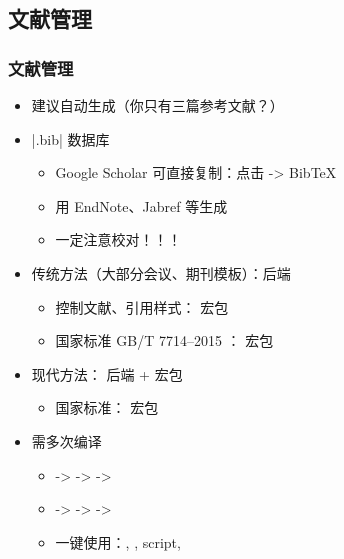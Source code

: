 \subsection{文献管理}
\begin{frame}[fragile]
    \frametitle{文献管理}
    \begin{itemize}
        \item 建议自动生成\pause （你只有三篇参考文献？）\pause
        \item |.bib| 数据库
              \begin{itemize}
                  \item Google Scholar 可直接复制：点击 \faQuoteRight \quad -> BibTeX
                  \item 用 EndNote、Jabref 等生成
                  \item 一定注意校对！！！
              \end{itemize} \pause
        \item 传统方法（大部分会议、期刊模板）：\BibTeX  后端
              \begin{itemize}
                  \item 控制文献、引用样式： 宏包
                  \item 国家标准 GB/T 7714--2015
                        ：
                        \alert{ 宏包}
              \end{itemize} \pause
        \item 现代方法： 后端 +  宏包

              \begin{itemize}
                  \item 国家标准： 宏包
              \end{itemize} \pause

        \item 需多次编译
              \begin{itemize}
                  \item \pdfLaTeX -> \BibTeX -> \pdfLaTeX -> \pdfLaTeX
                  \item \XeLaTeX -> \BibTeX -> \XeLaTeX -> \XeLaTeX
                  \item 一键使用：, ,  script, 
              \end{itemize}

    \end{itemize}
\end{frame}

